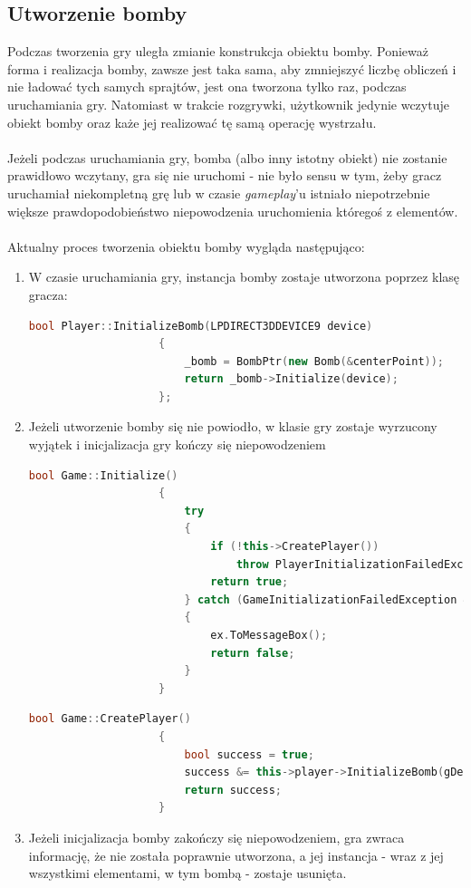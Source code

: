 \documentclass[a4paper,twoside]{article}
\begin{document}
			\subsection{Utworzenie bomby}
				Podczas tworzenia gry uległa zmianie konstrukcja obiektu bomby. Ponieważ forma i realizacja bomby, zawsze jest taka sama, aby zmniejszyć liczbę obliczeń i nie ładować tych samych sprajtów, jest ona tworzona tylko raz, podczas uruchamiania gry. Natomiast w trakcie rozgrywki, użytkownik jedynie wczytuje obiekt bomby oraz każe jej realizować tę samą operację wystrzału.\\\\
				Jeżeli podczas uruchamiania gry, bomba (albo inny istotny obiekt) nie zostanie prawidłowo wczytany, gra się nie uruchomi - nie było sensu w tym, żeby gracz uruchamiał niekompletną grę lub w czasie \textit{gameplay}'u istniało niepotrzebnie większe prawdopodobieństwo niepowodzenia uruchomienia któregoś z elementów.\\\\
				Aktualny proces tworzenia obiektu bomby wygląda następująco:
				\begin{enumerate}
					\item W czasie uruchamiania gry, instancja bomby zostaje utworzona poprzez klasę gracza:
					\begin{lstlisting}[language=C++]
					bool Player::InitializeBomb(LPDIRECT3DDEVICE9 device)
					{
						_bomb = BombPtr(new Bomb(&centerPoint));
						return _bomb->Initialize(device);
					};
					\end{lstlisting}
					\item Jeżeli utworzenie bomby się nie powiodło, w klasie gry zostaje wyrzucony wyjątek i inicjalizacja gry kończy się niepowodzeniem
					\begin{lstlisting}[language=C++]
					bool Game::Initialize()
					{
						try
						{
							if (!this->CreatePlayer())
								throw PlayerInitializationFailedException();
							return true;
						} catch (GameInitializationFailedException & ex)
						{
							ex.ToMessageBox();
							return false;
						}
					}
					\end{lstlisting}
					\begin{lstlisting}[language=C++]
					bool Game::CreatePlayer()
					{
						bool success = true;
						success &= this->player->InitializeBomb(gDevice->device);
						return success;
					}
					\end{lstlisting}
					\item Jeżeli inicjalizacja bomby zakończy się niepowodzeniem, gra zwraca informację, że nie została poprawnie utworzona, a jej instancja - wraz z jej wszystkimi elementami, w tym bombą - zostaje usunięta.
				\end{enumerate}
\end{document}
